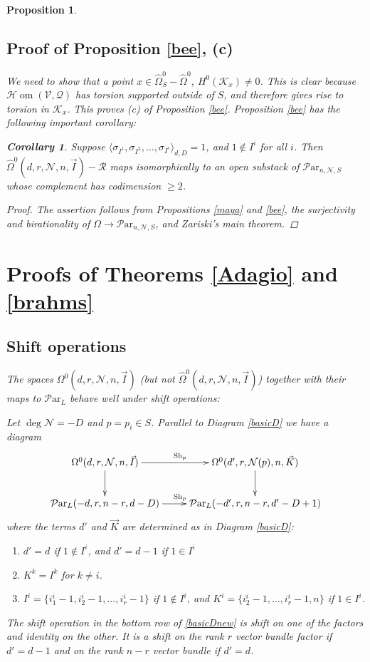 \documentclass[11pt]{amsart}
\newcommand\mk{\mathcal{K}}
\newcommand\mv{\mathcal{V}}
\newcommand\shom{\mathcal{H}{\operatorname{om}}}
\newcommand\mn{\mathcal{N}}
\newcommand\ParL{\mathcal{P}\text{ar}_L}
\newcommand\Par{\mathcal{P}\text{ar} }
\newtheorem{corollary}[theorem]{Corollary}
\newtheorem{proposition}[theorem]{Proposition}
\numberwithin{theorem}{subsection}
\begin{document}
{\begin{proposition}
\subsection{Proof of Proposition \ref{bee}, (c)}\label{martel}
We need to show that a point $x\in\widehat{\Omega}_{S}^0-\widehat{\Omega}^0$, $H^0(\mk_x)\neq 0$. This is clear because $\shom(\mv,\mathcal{Q})$ has torsion supported outside of $S$, and therefore gives rise to torsion in $\mk_x$.
This proves (c) of Proposition \ref{bee}. Proposition \ref{bee} has the following important corollary:
\begin{corollary}\label{carole}
Suppose $\langle\sigma_{I^1}, \sigma_{I^2},\dots,\sigma_{I^s}\rangle_{d,D}=1$, and $1\not\in I^i$ for all $i$. Then $\widehat{\Omega}^0(d,r,\mn,n,\vec{I})-\mathcal{R}$ maps isomorphically to an open substack of $\Par_{n,\mn,S}$ whose complement has codimension $\geq 2$.
\end{corollary}
\begin{proof}
 The assertion follows from Propositions \ref{maya} and \ref{bee}, the surjectivity and birationality of $\Omega\to \Par_{n,\mn,S}$, and Zariski's main theorem.
\end{proof}

\section{Proofs of Theorems \ref{Adagio} and \ref{brahms}}
\subsection{Shift operations}
The spaces ${\Omega}^0(d,r,\mn,n,\vec{I})$ (but not $\widehat{\Omega}^0(d,r,\mn,n,\vec{I})$) together with their maps to $\ParL$  behave well under shift operations:

Let $\deg\mn= -D$ and $p=p_i\in S$. Parallel to Diagram \eqref{basicD} we have a diagram
 \begin{equation}\label{basicDnew}
\xymatrix{
 \Omega^0(d,r,\mn,n,\vec{I})\ar[d]\ar[r]^{\operatorname{Sh}_p}  & \Omega^0(d',r,\mn(p),n,\vec{K})\ar[d]\\
\ParL(-d,r,n-r,d-D)\ar[r]^{\operatorname{Sh}_p}  & \ParL(-d',r,n-r,d'-D+1)
}
\end{equation}
where the terms $d'$ and $\vec{K}$ are determined as in Diagram \eqref{basicD}:
 \begin{enumerate}
 \item $d'=d$ if $1\notin I^i$, and $d'=d-1$ if $1\in I^i$
 \item $K^k=I^k$ for $k\neq i$.
 \item $I^i =\{i^i_1-1,i^i_2-1,\dots, i^i_r-1\}$ if $1\notin I^i$, and $K^i =\{i^i_2-1,\dots, i^i_r-1,n\}$ if $1\in I^i$.
 \end{enumerate}
 The shift operation in the bottom row of \eqref{basicDnew} is shift on one of the factors and identity on the other. It is a shift on the rank $r$ vector bundle factor if $d'=d-1$ and on the  rank $n-r$ vector bundle if $d'=d$.

\end{proposition}}
\end{document}
